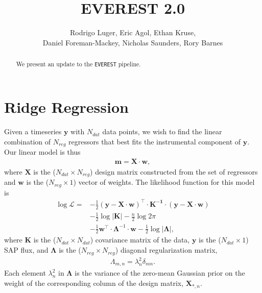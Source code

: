 \documentclass[]{emulateapj}
\begin{document}
\title{EVEREST 2.0}
\author{Rodrigo Luger, Eric Agol, Ethan Kruse, \\
Daniel Foreman-Mackey, Nicholas Saunders, Rory Barnes}

\begin{abstract}
We present an update to the \texttt{EVEREST} pipeline.
\end{abstract}

\section{Ridge Regression}
\label{sec:l2}
Given a timeseries $\mathbf{y}$ with $N_{dat}$ data points, we wish to find the linear
combination of $N_{reg}$ regressors that best fits the instrumental component of $\mathbf{y}$.
Our linear model is thus
%
\begin{align}
\label{eq:xdotw}
\mathbf{m} = \mathbf{X} \cdot \mathbf{w},
\end{align}
%
where $\mathbf{X}$ is the ($N_{dat} \times N_{reg}$) design matrix constructed from the set
of regressors and $\mathbf{w}$ is the ($N_{reg} \times 1$) vector of weights.
The likelihood function for this model is
\begin{align}
\label{eq:like}
\log\mathcal{L} =  &-\frac{1}{2} \left(\mathbf{y} - \mathbf{X} \cdot \mathbf{w}\right)^\top
                   \cdot
                   \mathbf{K^{-1}}
                   \cdot
                   \left(\mathbf{y} - \mathbf{X} \cdot \mathbf{w}\right) \nonumber\\  
                   &-\frac{1}{2} \log\left|\mathbf{K}\right| 
                   -\frac{n}{2}\log 2\pi \nonumber\\
                   &-\frac{1}{2}
                   \mathbf{w}^\top \cdot \mathbf{\Lambda}^{-1} \cdot \mathbf{w}
                   -\frac{1}{2} \log\left|\mathbf{\Lambda}\right|,
\end{align}
%
where $\mathbf{K}$ is the ($N_{dat} \times N_{dat}$) covariance matrix of the data, 
$\mathbf{y}$ is the ($N_{dat} \times 1$) SAP flux, and $\mathbf{\Lambda}$ is the 
($N_{reg} \times N_{reg}$) diagonal regularization matrix,
%
\begin{align}
\label{eq:Lambda}
\Lambda_{m,n} = \lambda_{n}^2\delta_{mn}.
\end{align}
%
Each element $\lambda_n^2$ in $\mathbf{\Lambda}$ is the variance of the 
zero-mean Gaussian prior on the weight of the corresponding column of the design matrix, 
$\mathbf{X}_{*,n}$.
\end{document}
